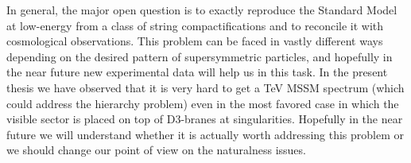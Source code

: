 \documentclass[12pt,a4paper]{book}
\begin{document}
In general, the major open question is to exactly reproduce the Standard Model at low-energy from a class of string compactifications and to reconcile it with cosmological observations. This problem can be faced in vastly different ways depending on the desired pattern of supersymmetric particles, and hopefully in the near future new experimental data will help us in this task. In the present thesis we have observed that it is very hard to get a TeV MSSM spectrum (which could address the hierarchy problem) even in the most favored case in which the visible sector is placed on top of D3-branes at singularities. Hopefully in the near future we will understand whether it is actually worth addressing this problem or we should change our point of view on the naturalness issues.




\backmatter



\end{document}

